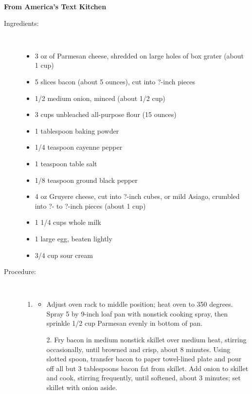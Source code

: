 \documentclass[11pt,letterpaper]{article}
\begin{document}


\begin{flushright}
{\bf From America's Text Kitchen}
\end{flushright}
 
 
\begin{description}

\item[Ingredients:]\ \\
	\begin{itemize}
	\item 3 oz of Parmesan cheese, shredded on large holes of box grater (about 1 cup)
	\item 5	slices bacon (about 5 ounces), cut into ?-inch pieces
	\item 1/2	medium onion, minced (about 1/2 cup)
	\item 3	cups unbleached all-purpose flour (15 ounces)
	\item 1	tablespoon baking powder
	\item 1/4 	teaspoon cayenne pepper
	\item 1	teaspoon table salt
	\item 1/8	teaspoon ground black pepper
	\item 4	oz Gruyere cheese, cut into ?-inch cubes, or mild Asiago, crumbled into ?- to ?-inch pieces (about 1 cup)
	\item 1 1/4 	cups whole milk
	\item 1	large egg, beaten lightly
	\item 3/4 	cup sour cream
	\end{itemize}

\item[Procedure:]\ \\
	\begin{enumerate}
	\item {\bf }
	\begin{itemize}
	\item Adjust oven rack to middle position; heat oven to 350 degrees. Spray 5 by 9-inch loaf pan with nonstick cooking spray, then sprinkle 1/2 cup Parmesan evenly in bottom of pan.

2. Fry bacon in medium nonstick skillet over medium heat, stirring occasionally, until browned and crisp, about 8 minutes. Using slotted spoon, transfer bacon to paper towel-lined plate and pour off all but 3 tablespoons bacon fat from skillet. Add onion to skillet and cook, stirring frequently, until softened, about 3 minutes; set skillet with onion aside.


\end{itemize}
\end{enumerate}
\end{description}
\end{document}

